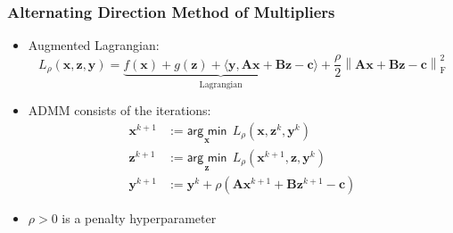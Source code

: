 \documentclass[aspectratio=169]{beamer}
\newcommand{\norm}[1]{\left\lVert#1\right\rVert}
\begin{document}
                \begin{frame}
                  \frametitle{Alternating Direction Method of Multipliers}
                  \begin{itemize}
                    \item Augmented Lagrangian:
                      \begin{equation*}
                        L_{\rho}(\bm x, \bm z, \bm y) = \underbrace{f(\bm x) + g(\bm z) + \langle \bm y, \bm A\bm x + \bm B \bm z - \bm c \rangle}_{\text{Lagrangian}}
                        + \dfrac{\rho}{2}\norm{\bm A\bm x + \bm B \bm z - \bm c}^2_{\mathrm{F}}
                      \end{equation*}
                    \item ADMM consists of the iterations:
                      \begin{align*}
                        \bm x^{k+1} & := \underset{\bm x}{\textsf{arg min}}~~ L_{\rho}(\bm x, \bm z^k, \bm y^k) \\
                        \bm z^{k+1} & := \underset{\bm z}{\textsf{arg min}}~~ L_{\rho}(\bm x^{k+1}, \bm z, \bm y^k) \\
                        \bm y^{k+1} & := \bm y^k + \rho\left(\bm A\bm x^{k+1} + \bm B \bm z^{k+1} - \bm c\right)
                      \end{align*}
                    \item $\rho > 0$ is a penalty hyperparameter
                  \end{itemize}
                \end{frame}
\end{document}
